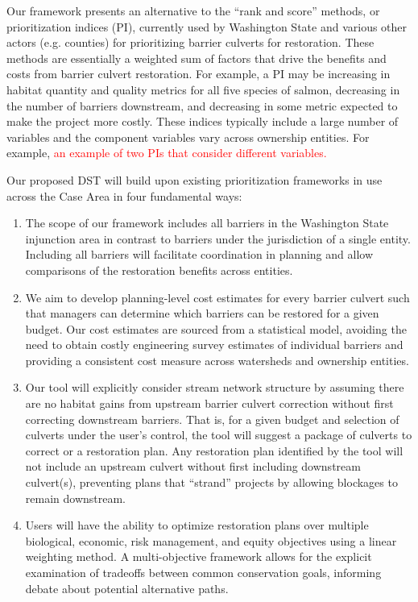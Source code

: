 \documentclass[12pt]{elsarticle}
\begin{document}
Our framework presents an alternative to the ``rank and score'' methods, or prioritization indices (PI), currently used by Washington State and various other actors (e.g. counties) for prioritizing barrier culverts for restoration. These methods are essentially a weighted sum of factors that drive the benefits and costs from barrier culvert restoration. For example, a PI may be increasing in habitat quantity and quality metrics for all five species of salmon, decreasing in the number of barriers downstream, and decreasing in some metric expected to make the project more costly. These indices typically include a large number of variables and the component variables vary across ownership entities. For example, \textcolor{red}{an example of two PIs that consider different variables.} 

Our proposed DST will build upon existing prioritization frameworks in use across the Case Area in four fundamental ways: 

\begin{enumerate}
\item The scope of our framework includes all barriers in the Washington State injunction area in contrast to barriers under the jurisdiction of a single entity. Including all barriers will facilitate coordination in planning and allow comparisons of the restoration benefits across entities.
\item We aim to develop planning-level cost estimates for every barrier culvert such that managers can determine which barriers can be restored for a given budget. Our cost estimates are sourced from a statistical model, avoiding the need to obtain costly engineering survey estimates of individual barriers and providing a consistent cost measure across watersheds and ownership entities. 
\item Our tool will explicitly consider stream network structure by assuming there are no habitat gains from upstream barrier culvert correction without first correcting downstream barriers. That is, for a given budget and selection of culverts under the user's control, the tool will suggest a package of culverts to correct or a restoration plan. Any restoration plan identified by the tool will not include an upstream culvert without first including downstream culvert(s), preventing plans that ``strand'' projects by allowing blockages to remain downstream. 
\item Users will have the ability to optimize restoration plans over multiple biological, economic, risk management, and equity objectives using a linear weighting method. A multi-objective framework allows for the explicit examination of tradeoffs between common conservation goals, informing debate about potential alternative paths. 
\end{enumerate}
\end{document}

